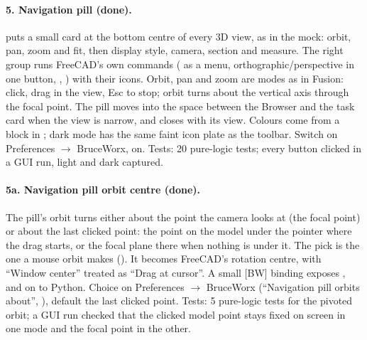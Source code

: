\paragraph{5. Navigation pill (done).}  puts a small card at the bottom centre of
every 3D view, as in the mock: orbit, pan, zoom and fit, then display style, camera, section and measure. The right
group runs FreeCAD's own commands ( as a menu, orthographic/perspective in one button,
, ) with their icons. Orbit, pan and zoom are modes as in Fusion:
click, drag in the view, Esc to stop; orbit turns about the vertical axis through the focal point. The pill moves
into the space between the Browser and the task card when the view is narrow, and closes with its view. Colours
come from a  block in ; dark mode has the same faint icon plate as
the toolbar. Switch on Preferences $\rightarrow$ BruceWorx, on. Tests: 20 pure-logic tests; every button clicked
in a GUI run, light and dark captured.

\paragraph{5a. Navigation pill orbit centre (done).} The pill's orbit turns either about the point the camera looks
at (the focal point) or about the last clicked point: the point on the model under the pointer where the drag
starts, or the focal plane there when nothing is under it. The pick is the one a mouse orbit makes
(). It becomes FreeCAD's rotation centre, with ``Window center'' treated
as ``Drag at cursor''. A small [BW] binding exposes ,  and
 on  to Python. Choice on Preferences $\rightarrow$ BruceWorx
(``Navigation pill orbits about'', ), default the last clicked point. Tests: 5 pure-logic
tests for the pivoted orbit; a GUI run checked that the clicked model point stays fixed on screen in one mode and
the focal point in the other.

